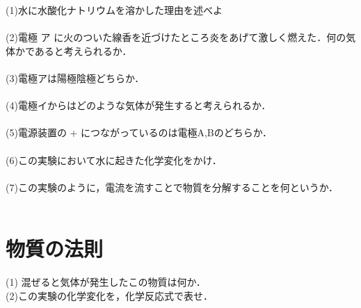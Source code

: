 \documentclass[autodetect-engine,dvi=dvipdfmx,ja=standard,
               a4j,11pt]{bxjsarticle}
\begin{document}
    (1)水に水酸化ナトリウムを溶かした理由を述べよ\\\\

    (2)電極 ア に火のついた線香を近づけたところ炎をあげて激しく燃えた．何の気体かであると考えられるか．\\\\

    (3)電極アは陽極陰極どちらか．\\\\

    (4)電極イからはどのような気体が発生すると考えられるか．\\\\

    (5)電源装置の + につながっているのは電極A,Bのどちらか．\\\\

    (6)この実験において水に起きた化学変化をかけ．\\\\

    (7)この実験のように，電流を流すことで物質を分解することを何というか．\\\\
    \clearpage
\section{物質の法則}
\begin{figure}[htb]
        \centering
        \vspace{20pt} %
        \caption{}
\end{figure}
    (1) 混ぜると気体が発生したこの物質は何か．\\

    (2)この実験の化学変化を，化学反応式で表せ．\\
\end{document}
